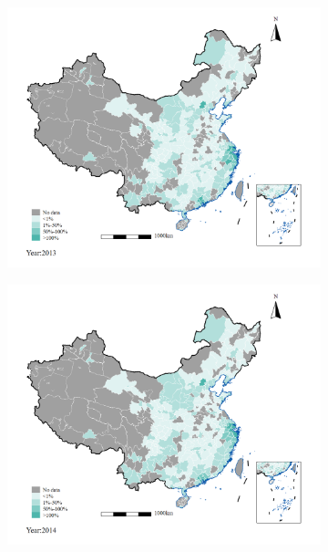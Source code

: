 \documentclass[12pt]{article}
\begin{document}
\begin{figure}[!htbp]
\begin{subfigure}{0.45\textwidth}
        \label{fig:2012}
    \end{subfigure}
    \hfill
    \begin{subfigure}{0.45\textwidth}
        \centering
        \includegraphics[width=\textwidth]{../Analysis/output/figure_immgrants_share_2013.png}
        \label{fig:2013}
    \end{subfigure}
    \hfill
    \begin{subfigure}{0.45\textwidth}
        \centering
        \includegraphics[width=\textwidth]{../Analysis/output/figure_immgrants_share_2014.png}

\end{subfigure}
\end{figure}
\end{document}
